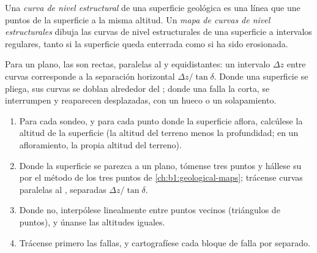 \begin{definition}\label{def:b1:cross-sections:structure-contour}
Una \emph{curva de nivel estructural} de una superficie geológica
es una línea que une puntos de la superficie a la misma altitud. Un \emph{mapa de curvas de nivel
estructurales} dibuja las curvas de nivel estructurales
de una superficie a intervalos regulares, tanto si la superficie queda enterrada como si ha sido
erosionada.
\end{definition}

Para un plano, las  son rectas, paralelas al  y equidistantes: un
intervalo $\Delta z$ entre curvas corresponde a la separación horizontal $\Delta z/\tan\delta$. Donde
una superficie se pliega, sus curvas se doblan alrededor del ; donde una falla la corta, se
interrumpen y reaparecen desplazadas, con un hueco o un solapamiento.

\begin{method}\label{met:b1:cross-sections:structure-contours}
\begin{enumerate}
  \item Para cada sondeo, y para cada punto donde la superficie aflora, calcúlese la altitud de la
        superficie (la altitud del terreno menos la profundidad; en un afloramiento, la propia
        altitud del terreno).
  \item Donde la superficie se parezca a un plano, tómense tres puntos y hállese su  por el
        método de los tres puntos de \cref{ch:b1:geological-maps}; trácense curvas paralelas al
        , separadas $\Delta z/\tan\delta$.
  \item Donde no, interpólese linealmente entre puntos vecinos (triángulos de puntos), y únanse las
        altitudes iguales.
  \item Trácense primero las fallas, y cartografíese cada bloque de falla por separado.
\end{enumerate}
\end{method}

